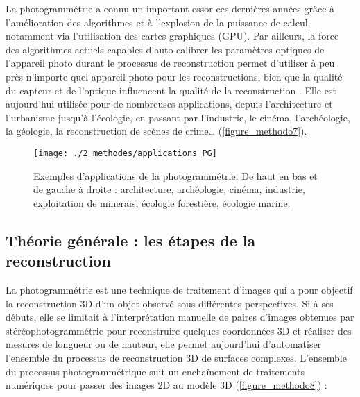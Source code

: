 La photogrammétrie a connu un important essor ces dernières années grâce à l’amélioration des algorithmes et à l’explosion de la puissance de calcul, notamment via l’utilisation des cartes graphiques (GPU). Par ailleurs, la force des algorithmes actuels capables d’auto-calibrer les paramètres optiques de l’appareil photo durant le processus de reconstruction \citep{forstner_photogrammetric_2016} permet d’utiliser à peu près n’importe quel appareil photo pour les reconstructions, bien que la qualité du capteur et de l’optique influencent la qualité de la reconstruction \citep{linder_digital_2016}. Elle est aujourd’hui utilisée pour de nombreuses applications, depuis l’architecture et l’urbanisme jusqu’à l’écologie, en passant par l’industrie, le cinéma, l’archéologie, la géologie, la reconstruction de scènes de crime… (\autoref{figure_methodo7}).

\begin{figure}[H]
	\begin{center}
	\texttt{[image: ./2\_methodes/applications\_PG]}
		\caption[Exemples d’applications de la photogrammétrie]{Exemples d’applications de la photogrammétrie. De haut en bas et de gauche à droite : architecture, archéologie, cinéma, industrie, exploitation de minerais, écologie forestière, écologie marine.}
	\label{figure_methodo7}
\end{center}
\end{figure}

\subsection{Théorie générale : les étapes de la reconstruction}

La photogrammétrie est une technique de traitement d’images qui a pour objectif la reconstruction 3D d’un objet observé sous différentes perspectives. Si à ses débuts, elle se limitait à l’interprétation manuelle de paires d’images obtenues par stéréophotogrammétrie pour reconstruire quelques coordonnées 3D et réaliser des mesures de longueur ou de hauteur, elle permet aujourd’hui d’automatiser l’ensemble du processus de reconstruction 3D de surfaces complexes. L’ensemble du processus photogrammétrique suit un enchaînement de traitements numériques pour passer des images 2D au modèle 3D (\autoref{figure_methodo8}) :

